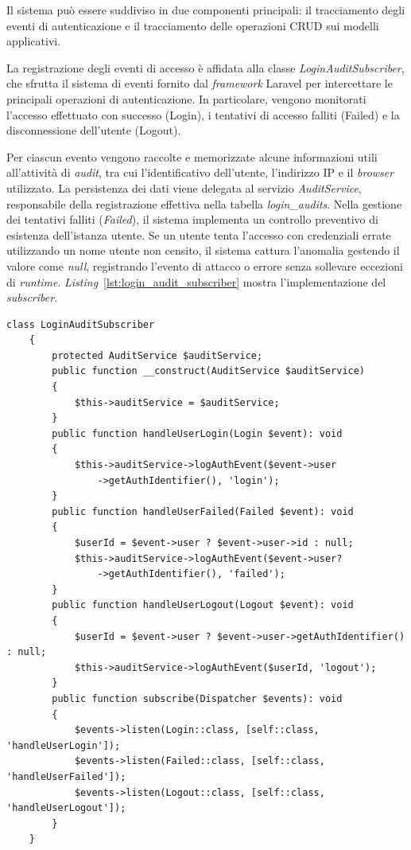 Il sistema può essere suddiviso in due componenti principali: il tracciamento degli eventi di autenticazione e il tracciamento delle operazioni CRUD sui modelli applicativi.

La registrazione degli eventi di accesso è affidata alla classe \textit{LoginAuditSubscriber}, che sfrutta il sistema di eventi fornito dal \textit{framework} Laravel per intercettare le principali operazioni di autenticazione. In particolare, vengono monitorati l’accesso effettuato con successo (Login), i tentativi di accesso falliti (Failed) e la disconnessione dell’utente (Logout).

Per ciascun evento vengono raccolte e memorizzate alcune informazioni utili all'attività di \textit{audit}, tra cui l'identificativo dell'utente, l'indirizzo IP e il \textit{browser} utilizzato.
La persistenza dei dati viene delegata al servizio \textit{AuditService}, responsabile della registrazione effettiva nella tabella \textit{login\_audits}.
Nella gestione dei tentativi falliti (\textit{Failed}), il sistema implementa un controllo preventivo di esistenza dell'istanza utente. Se un utente tenta l'accesso con credenziali errate utilizzando un nome utente non censito, il sistema cattura l'anomalia gestendo il valore come \textit{null}, registrando l'evento di attacco o errore senza sollevare eccezioni di \textit{runtime}.
\textit{Listing}~\ref{lst:login_audit_subscriber} mostra l'implementazione del \textit{subscriber}.
\begin{lstlisting}[float=!t, caption={Implementazione della classe LoginAuditSubscriber per il tracciamento degli eventi di autenticazione.}, captionpos=b, label={lst:login_audit_subscriber}, basicstyle=\ttfamily, breaklines=true, basicstyle=\ttfamily\footnotesize, lineskip=-1pt, breakatwhitespace=true]
	class LoginAuditSubscriber
	{
		protected AuditService $auditService;
		public function __construct(AuditService $auditService)
		{
			$this->auditService = $auditService;
		}
		public function handleUserLogin(Login $event): void
		{
			$this->auditService->logAuthEvent($event->user
				->getAuthIdentifier(), 'login');
		}
		public function handleUserFailed(Failed $event): void
		{
			$userId = $event->user ? $event->user->id : null;
			$this->auditService->logAuthEvent($event->user?
				->getAuthIdentifier(), 'failed');
		}
		public function handleUserLogout(Logout $event): void
		{
			$userId = $event->user ? $event->user->getAuthIdentifier() : null;
			$this->auditService->logAuthEvent($userId, 'logout');
		}
		public function subscribe(Dispatcher $events): void
		{
			$events->listen(Login::class, [self::class, 'handleUserLogin']);
			$events->listen(Failed::class, [self::class, 'handleUserFailed']);
			$events->listen(Logout::class, [self::class, 'handleUserLogout']);
		}
	}
\end{lstlisting}


